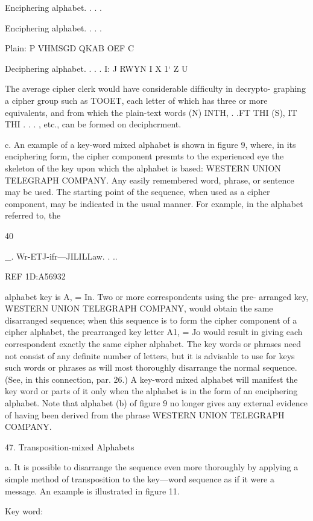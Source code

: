 Enciphering alphabet. . . .{

Enciphering alphabet. . . .{

Plain: P VHMSGD QKAB OEF C

Deciphering alphabet. . . . I: J RWYN I
X 1‘ Z
U

The average cipher clerk would have considerable difﬁculty in decrypto-
graphing a cipher group such as TOOET, each letter of which has three
or more equivalents, and from which the plain-text words (N) INTH,
. .FT THI (S), IT THI . . . , etc., can be formed on deciphcrment.

c. An example of a key-word mixed alphabet is shown in ﬁgure 9,
where, in its enciphering form, the cipher component presmts to the
experienced eye the skeleton of the key upon which the alphabet is
based: WESTERN UNION TELEGRAPH COMPANY. Any easily
remembered word, phrase, or sentence may be used. The starting point
of the sequence, when used as a cipher component, may be indicated
in the usual manner. For example, in the alphabet referred to, the

40

 

 

_. Wr-ETJ-ifr—JILILLaw. . ..

REF 1D:A56932

alphabet key is A, = In. Two or more correspondents using the pre-
arranged key, WESTERN UNION TELEGRAPH COMPANY,
would obtain the same disarranged sequence; when this sequence is to
form the cipher component of a cipher alphabet, the prearranged key
letter A1, = Jo would result in giving each correspondent exactly the
same cipher alphabet. The key words or phrases need not consist of any
deﬁnite number of letters, but it is advisable to use for keys such words
or phrases as will most thoroughly disarrange the normal sequence. (See,
in this connection, par. 26.) A key-word mixed alphabet will manifest
the key word or parts of it only when the alphabet is in the form of
an enciphering alphabet. Note that alphabet (b) of ﬁgure 9 no longer
gives any external evidence of having been derived from the phrase
WESTERN UNION TELEGRAPH COMPANY.

47. Transposition-mixed Alphabets

a. It is possible to disarrange the sequence even more thoroughly by
applying a simple method of transposition to the key—word sequence
as if it were a message. An example is illustrated in ﬁgure 11.

Key word:

}}
